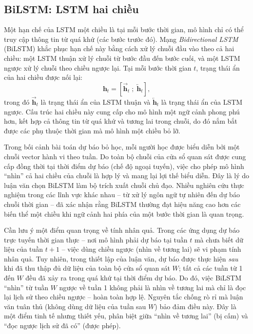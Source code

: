 \subsection{BiLSTM: LSTM hai chiều}

Một hạn chế của LSTM một chiều là tại mỗi bước thời gian, mô hình chỉ có thể truy cập thông tin từ quá khứ (các bước trước đó). Mạng \textit{Bidirectional LSTM} (BiLSTM) khắc phục hạn chế này bằng cách xử lý chuỗi đầu vào theo cả hai chiều: một LSTM thuận xử lý chuỗi từ bước đầu đến bước cuối, và một LSTM ngược xử lý chuỗi theo chiều ngược lại. Tại mỗi bước thời gian $t$, trạng thái ẩn của hai chiều được nối lại:
\begin{equation}
\mathbf{h}_t = \left[\overrightarrow{\mathbf{h}}_t \; ; \; \overleftarrow{\mathbf{h}}_t\right],
\end{equation}
trong đó $\overrightarrow{\mathbf{h}}_t$ là trạng thái ẩn của LSTM thuận và $\overleftarrow{\mathbf{h}}_t$ là trạng thái ẩn của LSTM ngược. Cấu trúc hai chiều này cung cấp cho mô hình một ngữ cảnh phong phú hơn, kết hợp cả thông tin từ quá khứ và tương lai trong chuỗi, do đó nắm bắt được các phụ thuộc thời gian mà mô hình một chiều bỏ lỡ.

Trong bối cảnh bài toán dự báo bỏ học, mỗi người học được biểu diễn bởi một chuỗi vector hành vi theo tuần. Do toàn bộ chuỗi của cửa sổ quan sát được cung cấp đồng thời tại thời điểm dự báo (chế độ ngoại tuyến), việc cho phép mô hình ``nhìn'' cả hai chiều của chuỗi là hợp lý và mang lại lợi thế biểu diễn. Đây là lý do luận văn chọn BiLSTM làm bộ trích xuất chuỗi chủ đạo. Nhiều nghiên cứu thực nghiệm trong các lĩnh vực khác nhau -- từ xử lý ngôn ngữ tự nhiên đến dự báo chuỗi thời gian -- đã xác nhận rằng BiLSTM thường đạt hiệu năng cao hơn các biến thể một chiều khi ngữ cảnh hai phía của một bước thời gian là quan trọng.

Cần lưu ý một điểm quan trọng về tính nhân quả. Trong các ứng dụng dự báo trực tuyến thời gian thực -- nơi mô hình phải dự báo tại tuần $t$ mà chưa biết dữ liệu của tuần $t+1$ -- việc dùng chiều ngược (nhìn về tương lai) sẽ vi phạm tính nhân quả. Tuy nhiên, trong thiết lập của luận văn, dự báo được thực hiện \emph{sau} khi đã thu thập đủ dữ liệu của toàn bộ cửa sổ quan sát $W$; tất cả các tuần từ 1 đến $W$ đều đã xảy ra trong quá khứ tại thời điểm dự báo. Do đó, việc BiLSTM ``nhìn'' từ tuần $W$ ngược về tuần 1 không phải là nhìn về tương lai mà chỉ là đọc lại lịch sử theo chiều ngược -- hoàn toàn hợp lệ. Nguyên tắc chống rò rỉ mà luận văn tuân thủ (không dùng dữ liệu của tuần sau $W$) bảo đảm điều này. Đây là một điểm tinh tế nhưng thiết yếu, phân biệt giữa ``nhìn về tương lai'' (bị cấm) và ``đọc ngược lịch sử đã có'' (được phép).

